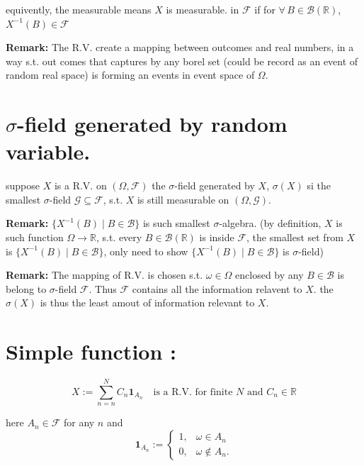 \documentclass[
  letterpaper,
  DIV=11,
  numbers=noendperiod]{scrreprt}
\theoremstyle{definition}
\theoremstyle{plain}
\theoremstyle{plain}
\theoremstyle{definition}
\theoremstyle{plain}
\theoremstyle{plain}
\theoremstyle{remark}
\begin{document}
equivently, the measurable means \(X\) is measurable. in \(\mathcal{F}\)
if for \(\forall\, B \in \mathcal{B}(\mathbb{R})\),
\(X^{-1}(B) \in \mathcal{F}\)

\textbf{Remark:} The R.V. create a mapping between outcomes and real
numbers, in a way s.t. out comes that captures by any borel set (could
be record as an event of random real space) is forming an events in
event space of \(\Omega\).

\section{\texorpdfstring{\(\sigma\)-field generated by random
variable.}{\textbackslash sigma-field generated by random variable.}}\label{sigma-field-generated-by-random-variable.}

suppose \(X\) is a R.V. on \((\Omega, \mathcal{F})\) the
\(\sigma\)-field generated by \(X\), \(\sigma(X)\) si the smallest
\(\sigma\)-field \(\mathcal{G} \subseteq \mathcal{F}\), s.t. \(X\) is
still measurable on \((\Omega, \mathcal{G})\).

\textbf{Remark:} \(\{X^{-1}(B) \mid B \in \mathcal{B}\}\) is such
smallest \(\sigma\)-algebra. (by definition, \(X\) is such function
\(\Omega \to \mathbb{R}\), s.t. every \(B \in \mathcal{B}(\mathbb{R})\)
is inside \(\mathcal{F}\), the smallest set from \(X\) is
\(\{X^{-1}(B) \mid B \in \mathcal{B}\}\), only need to show
\(\{X^{-1}(B) \mid B \in \mathcal{B}\}\) is \(\sigma\)-field)

\textbf{Remark:} The mapping of R.V. is chosen s.t.
\(\omega \in \Omega\) enclosed by any \(B \in \mathcal{B}\) is belong to
\(\sigma\)-field \(\mathcal{F}\). Thus \(\mathcal{F}\) contains all the
information relavent to \(X\). the \(\sigma(X)\) is thus the least amout
of information relevant to \(X\).

\section{Simple function :}\label{simple-function}

\[
X := \sum_{n=n}^{N} C_n \mathbf{1}_{A_n} \quad \text{is a R.V. for finite } N \text{ and } C_n \in \mathbb{R}
\]

here \(A_n \in \mathcal{F}\) for any \(n\) and \[
\mathbf{1}_{A_n} := \begin{cases} 1, & \omega \in A_n \\ 0, & \omega \notin A_n. \end{cases}
\]
\end{document}
